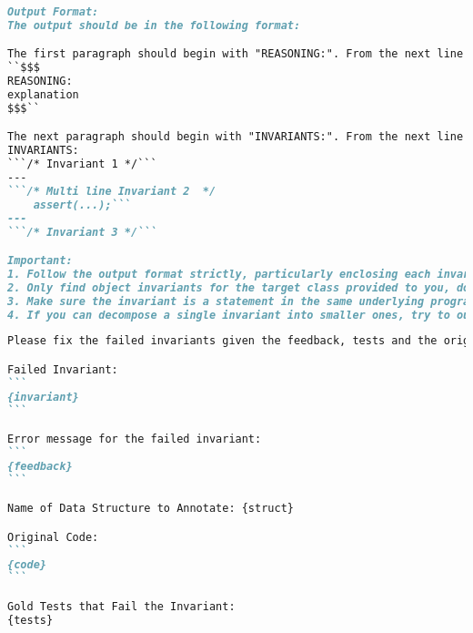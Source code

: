 \begin{figure*}[htp]
\begin{lstlisting}[language=markdown]
Output Format:
The output should be in the following format:

The first paragraph should begin with "REASONING:". From the next line onwards, it should contain the detailed reasoning and analysis used for the inference of the object invariants. The entire text should be enclosed in $$$. For example,
``$$$
REASONING: 
explanation
$$$``

The next paragraph should begin with "INVARIANTS:". From the next line onwards, it should contain a list of the various invariants inferred. The invariants should be in the form of code in the same underlying programming language, enclosed by ```. Each invariant should start from a new line, and be separated by "---". For example, 
INVARIANTS: 
```/* Invariant 1 */```
---
```/* Multi line Invariant 2  */
    assert(...);```
---
```/* Invariant 3 */```

Important:
1. Follow the output format strictly, particularly enclosing each invariant in triple-ticks (```), and enclosing the reasoning in $$$.
2. Only find object invariants for the target class provided to you, do not infer invariants for any other class. 
3. Make sure the invariant is a statement in the same underlying programming language as the source program.
4. If you can decompose a single invariant into smaller ones, try to output multiple invariants.
\end{lstlisting}
    \caption{\tech Refinement system prompt: instruction and task description.}
    \label{appendix:prompt_refinement_system}
\end{figure*}



\begin{figure*}[htp]
\begin{lstlisting}[language=markdown]
Please fix the failed invariants given the feedback, tests and the original source code.

Failed Invariant:
```
{invariant}
```

Error message for the failed invariant:
```
{feedback}
```

Name of Data Structure to Annotate: {struct}

Original Code:
```
{code}
```

Gold Tests that Fail the Invariant:
{tests}

\end{lstlisting}
\vspace{-0.1in}
    \caption{\tech Refinement user prompt template.}
    \label{appendix:prompt_refinement_user}
\end{figure*}